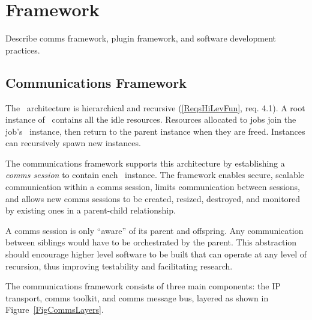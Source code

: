 \section{Framework}

Describe comms framework, plugin framework, and software
development practices.

\subsection{Communications Framework}

The \ngrm\ architecture is hierarchical and recursive
(\ref{ReqsHiLevFun}, req. 4.1).
A root instance of \ngrm\ contains all the
idle resources.  Resources allocated to jobs
join the job's \ngrm\ instance, then return to the parent instance
when they are freed.  Instances can recursively spawn new instances.

The communications framework supports this architecture by
establishing a {\em comms session} to contain each \ngrm\ instance.
The framework enables secure, scalable communication
within a comms session, limits communication between sessions,
and allows new comms sessions to be created, resized, destroyed,
and monitored by existing ones in a parent-child relationship.

A comms session is only ``aware'' of its parent and offspring.
Any communication between siblings would have to be orchestrated by
the parent.  This abstraction should encourage higher level software
to be built that can operate at any level of recursion, thus improving
testability and facilitating research.

The communications framework consists of three main components:
the IP transport, comms toolkit, and comms message bus, layered
as shown in Figure~\ref{FigCommsLayers}.

